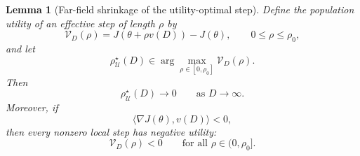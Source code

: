 \documentclass{article}
\theoremstyle{plain}
\newtheorem{lemma}[theorem]{Lemma}
\theoremstyle{definition}
\theoremstyle{remark}
\begin{document}
\begin{lemma}[Far-field shrinkage of the utility-optimal step]
Define the population utility of an effective step of length \(\rho\) by
\begin{equation}
    \mathcal V_D(\rho)
    =
    J\!\left(
        \theta+\rho v(D)
    \right)
    -
    J(\theta),
    \qquad
    0\leq\rho\leq\rho_0,
    \label{eq:effective_step_utility}
\end{equation}
and let
\begin{equation}
    \rho_{\mathcal U}^{\star}(D)
    \in
    \arg\max_{\rho\in[0,\rho_0]}
    \mathcal V_D(\rho).
    \label{eq:utility_optimal_effective_step}
\end{equation}
Then
\begin{equation}
    \rho_{\mathcal U}^{\star}(D)
    \longrightarrow 0
    \qquad
    \text{as }
    D\longrightarrow\infty.
    \label{eq:optimal_step_vanishes}
\end{equation}
Moreover, if
\[
    \langle\nabla J(\theta),v(D)\rangle<0,
\]
then every nonzero local step has negative utility:
\begin{equation}
    \mathcal V_D(\rho)<0
    \qquad
    \text{for all }
    \rho\in(0,\rho_0].
    \label{eq:negative_far_field_utility}
\end{equation}
\end{lemma}
\end{document}
